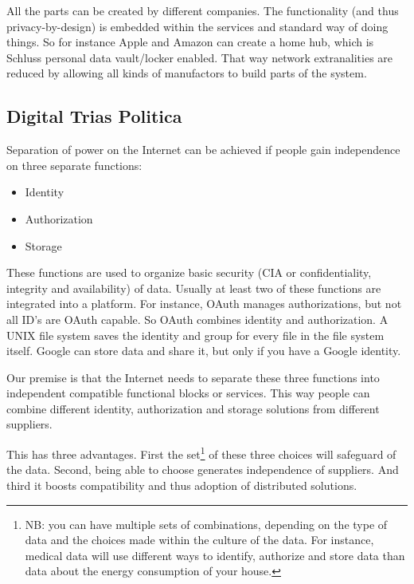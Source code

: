 \documentclass{article}
\begin{document}
All the parts can be created by different companies. The functionality (and thus privacy-by-design) is embedded within the services and standard way of doing things. So for instance Apple and Amazon can create a home hub, which is Schluss personal data vault/locker enabled. That way network extranalities are reduced by allowing all kinds of manufactors to build parts of the system.

\subsection{Digital Trias Politica}
Separation of power on the Internet can be achieved if people gain independence on three separate functions:

\begin{itemize}
    \item Identity
    \item Authorization
    \item Storage
\end{itemize}

These functions are used to organize basic security (CIA or confidentiality, integrity and availability) of data. Usually at least two of these functions are integrated into a platform. For instance, OAuth manages authorizations, but not all ID's are OAuth capable. So OAuth combines identity and authorization. A UNIX file system saves the identity and group for every file in the file system itself. Google can store data and share it, but only if you have a Google identity. 

Our premise is that the Internet needs to separate these three functions into independent compatible functional blocks or services. This way people can combine different identity, authorization and storage solutions from different suppliers.

This has three advantages. First the set\footnote{NB: you can have multiple sets of combinations, depending on the type of data and the choices made within the culture of the data. For instance, medical data will use different ways to identify, authorize and store data than data about the energy consumption of your house.} of these three choices will safeguard of the data. Second, being able to choose generates independence of suppliers. And third it boosts compatibility and thus adoption of distributed solutions.

\end{document}
